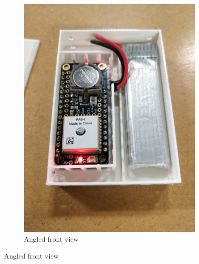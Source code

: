 \begin{appendices}
\begin{figure}[H]
\begin{subfigure}[b]{0.4\textwidth}
            \label{fig:case1top}
        \end{subfigure}
        \hfill
        \begin{subfigure}[b]{0.4\textwidth}   
            \centering 
            \includegraphics[width=\textwidth]{../figures/Pics/firstcase4.jpg}
            \caption{Angled front view}
        \end{subfigure}        
    \end{figure}
    \vfill
    \clearpage


    

\end{appendices}
